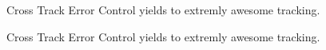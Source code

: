 \begin{figure}[h]
    \centering
    \def\svgwidth{0.5\columnwidth}
    
    \caption{Cross Track Error Control yields to extremly awesome tracking.}
    \label{fig:scene_crossTrack}
\end{figure}


\begin{figure}[h]
    \centering
    \def\svgwidth{\columnwidth}
    
    \caption{Cross Track Error Control yields to extremly awesome tracking.}
    \label{fig:crossTrack}
\end{figure}


%

